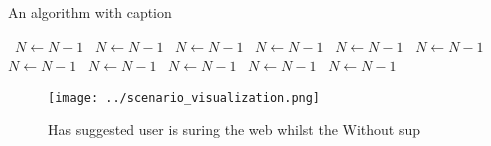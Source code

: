 \documentclass[a4paper]{article}
\begin{document}
\begin{algorithm}
\caption{An algorithm with caption}
\begin{algorithmic}
\    \State $N \gets N - 1$
\    \State $N \gets N - 1$
\    \State $N \gets N - 1$
\    \State $N \gets N - 1$
\    \State $N \gets N - 1$
\    \State $N \gets N - 1$
\    \State $N \gets N - 1$
\    \State $N \gets N - 1$
\    \State $N \gets N - 1$
\    \State $N \gets N - 1$
\    \State $N \gets N - 1$
\EndWhile
\end{algorithmic}
\end{algorithm}

\begin{figure}
\centering
\texttt{[image: ../scenario\_visualization.png]}
\caption{Has suggested user is suring the web whilst the Without sup
}
\end{figure}
 
\end{document}

